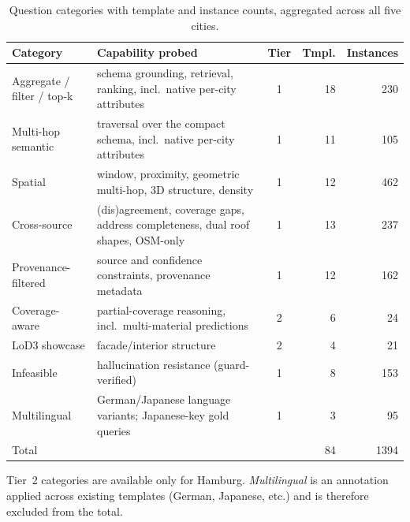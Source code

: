 \documentclass[sigconf,authordraft]{acmart}
\begin{document}
\begin{table}[h!]
  \caption{
    Question categories with template and instance counts, aggregated across all five cities.  
    }
  \label{tab:categories}
  \begin{tabularx}{\textwidth}{lXcrr}
    \toprule
    Category & Capability probed & Tier & Tmpl. & Instances \\
    \midrule
    Aggregate / filter / top-k & schema grounding, retrieval, ranking, incl.\ native per-city attributes 
              & 1 & 18 & 230 \\
    Multi-hop semantic & traversal over the compact schema, incl.\ native per-city attributes 
              & 1 & 11 & 105 \\
    Spatial & window, proximity, geometric multi-hop, 3D structure, density & 1 & 12 & 462 \\
    Cross-source & (dis)agreement, coverage gaps, address completeness, dual roof shapes, OSM-only
              & 1 & 13 & 237 \\
    Provenance-filtered & source and confidence constraints, provenance metadata
            & 1 & 12 & 162 \\
    Coverage-aware & partial-coverage reasoning, incl.\ multi-material predictions & 2 & 6 & 24 \\
    LoD3 showcase & facade/interior structure & 2 & 4 & 21 \\
    Infeasible & hallucination resistance (guard-verified) & 1 & 8 & 153 \\
    Multilingual & German/Japanese language variants; Japanese-key gold queries & 1 & 3 & 95 \\
    \midrule
    Total & & & 84 & \num{1394} \\
    \bottomrule
  \end{tabularx}

  \smallskip\raggedright\footnotesize
  Tier~2 categories are available only for Hamburg. \emph{Multilingual} is an annotation applied across existing templates (German, Japanese, etc.) and is therefore excluded from the total.
\end{table}
\end{document}
